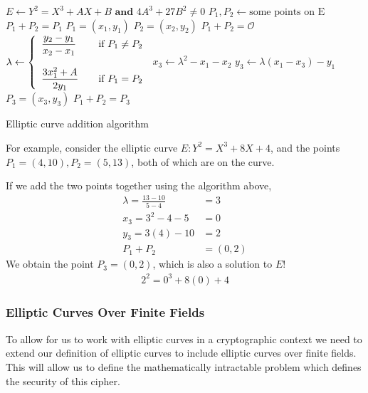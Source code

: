 \documentclass[12pt, a4paper, draft]{report}
\begin{document}
\begin{algorithm}
\begin{algorithmic}[1]
    \Ensure $E \leftarrow Y^2 = X^3 + AX + B \textbf{ and } 4A^3 + 27B^2 \neq 0$
    \Require $P_1, P_2 \leftarrow \text{some points on E}$
        \Return $P_1 + P_2 = P_1$
    \Else
        \State $P_1 = (x_1, y_1)$
        \State $P_2 = (x_2, y_2)$
            \Return $P_1 + P_2 = \mathcal{O}$
        \Else
            \State $\lambda \leftarrow \left\{
                \begin{array}{l l}
                    \dfrac{y_2 - y_1}{x_2 - x_1} & \quad \text{if $P_1 \neq P_2$}\\\\
                    \dfrac{3x_1^2 + A}{2y_1} & \quad \text{if $P_1 = P_2$}\\
                \end{array}
                \right.$
            \State $x_3 \leftarrow \lambda^2 - x_1 - x_2$
            \State $y_3 \leftarrow \lambda(x_1 - x_3) - y_1$
            \State $P_3 = (x_3, y_3)$
            \Return $P_1 + P_2 = P_3$
        \EndIf
    \EndIf
\end{algorithmic}
\caption{Elliptic curve addition algorithm}
\end{algorithm}

For example, consider the elliptic curve $E: Y^2 = X^3 + 8X + 4$, and the
points $P_1 = (4, 10), P_2 = (5, 13)$, both of which are on the curve.

If we add the two points together using the algorithm above,
\begin{align*}
    \lambda = \frac{13 - 10}{5 - 4} &= 3\\
    x_3 = 3^2 - 4 - 5 &= 0\\
    y_3 = 3(4) - 10 &= 2\\
    P_1 + P_2 &= (0, 2)
\end{align*}
We obtain the point $P_3 = (0, 2)$, which is also a solution to $E$!
\begin{align*}
    2^2 = 0^3 + 8(0) + 4
\end{align*}

\subsubsection{Elliptic Curves Over Finite Fields}

To allow for us to work with elliptic curves in a cryptographic
context we need to extend our definition of elliptic curves to
include elliptic curves over finite fields. This will allow
us to define the mathematically intractable problem which defines
the security of this cipher.
\end{document}
